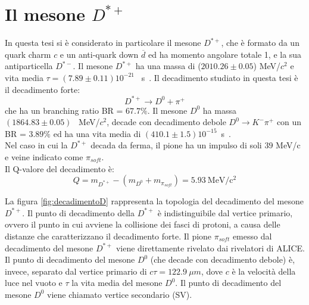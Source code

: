 \section{Il mesone $D^{*+}$} \label{mesoneD}
In questa tesi si \`e considerato in particolare il mesone $D^{*+}$, che \`e formato da un quark charm $c$ e un anti-quark down $\overline{d}$ ed ha momento angolare totale 1, e la sua antiparticella $D^{*-}$. Il mesone $D^{*+}$ ha una massa di ($2010.26 \pm 0.05$) MeV/$c^2$ e vita media $ \tau = (7.89 \pm 0.11) {10^{-21}}$~ s~\cite{PDG}. Il decadimento studiato in questa tesi \`e il decadimento forte:
    \begin{equation}
         D^{*+} \rightarrow D^0 + \pi^+ 
    \end{equation}
    che ha un branching ratio BR = $67.7 \%$. 
    Il mesone $D^0$ ha massa $ (1864.83 \pm 0.05)$~ MeV/$c^2$, decade con decadimento debole $D^0 \rightarrow K^- \pi^+$ con un BR = $3.89 \%$ ed ha una vita media di $(410.1 \pm 1.5 ) 10^{-15}$~s~\cite{PDG}.
\\Nel caso in cui la $D^{*+}$ decada da ferma, il pione ha un impulso di soli $39$ MeV/c e veine indicato come $\pi_{soft}$. \\Il Q-valore del decadimento \`e:
    \begin{equation}
        Q = m_{D^{*+}} - (m_{D^{0}} + m_{\pi_{soft}}) = 5.93 \ \mathrm{MeV/c^2}
    \end{equation}

La figura \ref{fig:decadimentoD} rappresenta la topologia del decadimento del mesone $D^{*+}$. Il punto di decadimento della $D^{*+}$ \`e indistinguibile dal vertice primario, ovvero il punto in cui avviene la collisione dei fasci di protoni, a causa delle distanze che caratterizzano il decadimento forte. Il pione $\pi_{soft}$ emesso dal decadimento del mesone $D^{*+}$ viene direttamente rivelato dai rivelatori di ALICE. Il punto di decadimento del mesone $D^0$ (che decade con decadimento debole) \`e, invece, separato dal vertice primario di $c\tau = 122.9 \ \mu m $, dove $c$ \`e la velocit\`a della luce nel vuoto e $\tau$ la vita media del mesone $D^0$. Il punto di decadimento del mesone $D^0$ viene chiamato vertice secondario (SV).
 
